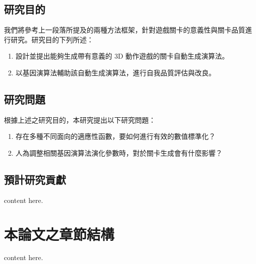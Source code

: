 \subsection{研究目的}

我們將參考上一段落所提及的兩種方法框架，針對遊戲關卡的意義性與關卡品質進行研究。研究目的下列所述：

\begin{enumerate}
  \item 設計並提出能夠生成帶有意義的 3D 動作遊戲的關卡自動生成演算法。
  \item 以基因演算法輔助該自動生成演算法，進行自我品質評估與改良。
\end{enumerate}

\subsection{研究問題}

根據上述之研究目的，本研究提出以下研究問題：

\begin{enumerate}
  \item 存在多種不同面向的適應性函數，要如何進行有效的數值標準化？
  \item 人為調整相關基因演算法演化參數時，對於關卡生成會有什麼影響？
\end{enumerate}

\subsection{預計研究貢獻}

content here.

\section{本論文之章節結構}

content here.

